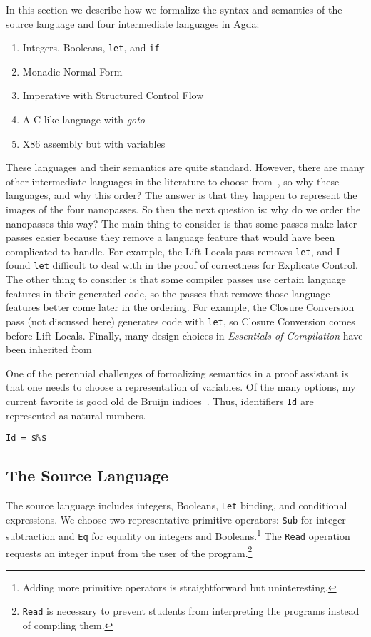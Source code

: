 \documentclass[sigplan,screen]{acmart}
\begin{document}
In this section we describe how we formalize the syntax and semantics
of the source language and four intermediate languages in Agda:
\begin{enumerate}
\item Integers, Booleans, \texttt{let}, and \texttt{if}
\item Monadic Normal Form
\item Imperative with Structured Control Flow
\item A C-like language with \emph{goto}
\item X86 assembly but with variables
\end{enumerate}
These languages and their semantics are quite standard. However, there
are many other intermediate languages in the literature to choose
from~\citep{Flanagan:1993cg,Hatcliff:1994vn,Kelsey:1995uq,Birkedal:1996aa},
so why these languages, and why this order?  The answer is that they
happen to represent the images of the four nanopasses.  So then the
next question is: why do we order the nanopasses this way? The main
thing to consider is that some passes make later passes easier because
they remove a language feature that would have been complicated to
handle. For example, the Lift Locals pass removes \texttt{let}, and I
found \texttt{let} difficult to deal with in the proof of correctness
for Explicate Control. The other thing to consider is that some
compiler passes use certain language features in their generated code,
so the passes that remove those language features better come later in
the ordering.  For example, the Closure Conversion pass (not discussed
here) generates code with \texttt{let}, so Closure Conversion comes
before Lift Locals. Finally, many design choices in \emph{Essentials
of Compilation} have been inherited from \citet{Dybvig:2010aa}

One of the perennial challenges of formalizing semantics in a proof
assistant is that one needs to choose a representation of variables.
Of the many options, my current favorite is good old de Bruijn
indices~\citep{Bruijn:1972kx}.  Thus, identifiers \lstinline{Id} are
represented as natural numbers.
\begin{lstlisting}
Id = $ℕ$
\end{lstlisting}

\subsection{The Source Language}

The source language includes integers, Booleans, \texttt{Let} binding,
and conditional expressions. We choose two representative primitive
operators: \texttt{Sub} for integer subtraction and \texttt{Eq} for
equality on integers and Booleans.\footnote{Adding more primitive
operators is straightforward but uninteresting.}  The \texttt{Read}
operation requests an integer input from the user of the
program.\footnote{\texttt{Read} is necessary to prevent students from
interpreting the programs instead of compiling them.}
\end{document}
